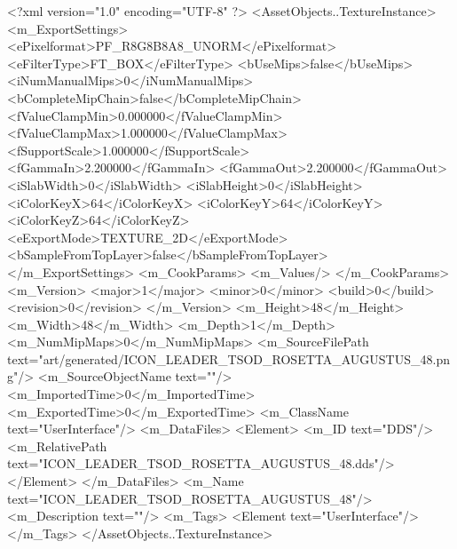 <?xml version="1.0" encoding="UTF-8" ?>
<AssetObjects..TextureInstance>
	<m_ExportSettings>
		<ePixelformat>PF_R8G8B8A8_UNORM</ePixelformat>
		<eFilterType>FT_BOX</eFilterType>
		<bUseMips>false</bUseMips>
		<iNumManualMips>0</iNumManualMips>
		<bCompleteMipChain>false</bCompleteMipChain>
		<fValueClampMin>0.000000</fValueClampMin>
		<fValueClampMax>1.000000</fValueClampMax>
		<fSupportScale>1.000000</fSupportScale>
		<fGammaIn>2.200000</fGammaIn>
		<fGammaOut>2.200000</fGammaOut>
		<iSlabWidth>0</iSlabWidth>
		<iSlabHeight>0</iSlabHeight>
		<iColorKeyX>64</iColorKeyX>
		<iColorKeyY>64</iColorKeyY>
		<iColorKeyZ>64</iColorKeyZ>
		<eExportMode>TEXTURE_2D</eExportMode>
		<bSampleFromTopLayer>false</bSampleFromTopLayer>
	</m_ExportSettings>
	<m_CookParams>
		<m_Values/>
	</m_CookParams>
	<m_Version>
		<major>1</major>
		<minor>0</minor>
		<build>0</build>
		<revision>0</revision>
	</m_Version>
	<m_Height>48</m_Height>
	<m_Width>48</m_Width>
	<m_Depth>1</m_Depth>
	<m_NumMipMaps>0</m_NumMipMaps>
	<m_SourceFilePath text="art/generated/ICON_LEADER_TSOD_ROSETTA_AUGUSTUS_48.png"/>
	<m_SourceObjectName text=""/>
	<m_ImportedTime>0</m_ImportedTime>
	<m_ExportedTime>0</m_ExportedTime>
	<m_ClassName text="UserInterface"/>
	<m_DataFiles>
		<Element>
			<m_ID text="DDS"/>
			<m_RelativePath text="ICON_LEADER_TSOD_ROSETTA_AUGUSTUS_48.dds"/>
		</Element>
	</m_DataFiles>
	<m_Name text="ICON_LEADER_TSOD_ROSETTA_AUGUSTUS_48"/>
	<m_Description text=""/>
	<m_Tags>
		<Element text="UserInterface"/>
	</m_Tags>
</AssetObjects..TextureInstance>
